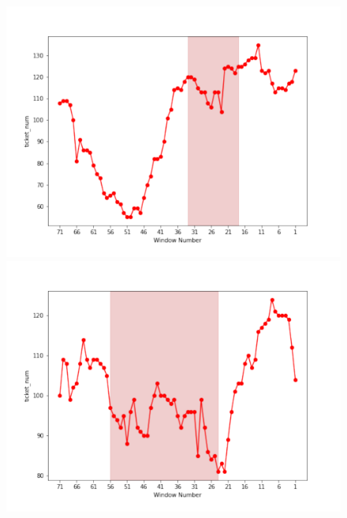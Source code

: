 \documentclass[submit]{ipsj}
\begin{document}
\begin{figure}[t]
  \centering
\begin{minipage}{.23\textwidth}
    \includegraphics[width=1.1\columnwidth]{Uenaka_fig/RQ2_kousatu/Neutron_ticket_num.pdf}
\end{minipage}
\hfill
\begin{minipage}{.23\textwidth}
    \includegraphics[width=1.1\columnwidth]{Uenaka_fig/RQ2_kousatu/Cinder_ticket_num.pdf}
\end{minipage}
\hfill
\begin{minipage}{.23\textwidth}

\end{minipage}
\end{figure}
\end{document}

